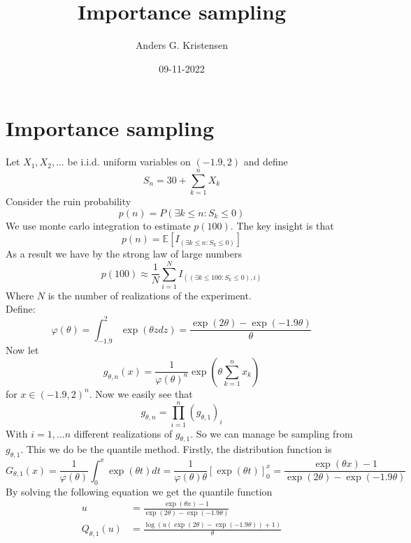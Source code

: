\documentclass[a4paper, 11 pt]{article}
\title{Importance sampling}
\author{Anders G. Kristensen}
\date{09-11-2022}
\begin{document}
\maketitle
\section{Importance sampling}
\noindent Let $X_1,X_2,\dots$ be i.i.d. uniform variables on $(-1.9, 2)$ and define
\[
    S_n = 30 + \sum_{k = 1}^n X_k
\]
Consider the ruin probability
\[
    p(n) = P(\exists k\leq n : S_k \leq 0)
\]
We use monte carlo integration to estimate $p(100)$. The key insight is that
\[
    p(n) = \mathbb{E}\left[I_{\left(\exists k\leq n : S_k\leq 0\right)}\right]    
\]
As a result we have by the strong law of large numbers
\[
    p(100) \approx \frac{1}{N}\sum_{i = 1}^N I_{\left(\left(\exists k\leq 100 : S_k\leq 0\right),i\right)}
\]
Where $N$ is the number of realizations of the experiment.\\
Define:
\[
\varphi(\theta) = \int_{-1.9}^2 \exp\left(\theta z dz\right) = \frac{\exp\left(2\theta\right)-\exp\left(-1.9\theta\right)}{\theta}    
\]
Now let 
\[
    g_{\theta, n}(x) = \frac{1}{\varphi(\theta)^n}\exp{\left(\theta \sum_{k = 1}^n x_k\right)}  
\]
for $x\in(-1.9,2)^n$. Now we easily see that 
\[
    g_{\theta, n} = \prod_{i = 1}^n\left(g_{\theta, 1}\right)_i
\]
With $i = 1,\dots n$ different realizations of $g_{\theta,1}$. So we can manage be sampling from $g_{\theta,1}$. This we do be the quantile method. Firstly, the distribution function is
\[
    G_{\theta,1}(x) = \frac{1}{\varphi(\theta)}\int_0^x \exp\left(\theta t\right)dt = \frac{1}{\varphi(\theta)\theta}\left[\exp(\theta t)\right]_0^x = \frac{\exp(\theta x)-1}{\exp(2\theta)-\exp(-1.9\theta)}
\]
By solving the following equation we get the quantile function
\begin{align*}
    u &= \frac{\exp\left(\theta x\right)-1}{\exp(2\theta)-\exp(-1.9\theta)} \\
    Q_{\theta,1}(u) &= \frac{\log\left(u\left(\exp(2\theta)-\exp(-1.9\theta)\right)+1\right)}{\theta}
\end{align*}
\end{document}
